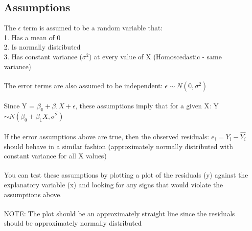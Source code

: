 \documentclass[12pt, a4paper]{article}
\begin{document}
	\subsection{Assumptions}
	The $\epsilon$ term is assumed to be a random variable that: \\
	1. Has a mean of 0 \\
	2. Is normally distributed \\
	3. Has constant variance ($\sigma^2$) at every value of X (Homoscedastic - same variance) \\~\\
	The error terms are also assumed to be independent: $\epsilon \sim N(0,\sigma^2)$ \\~\\
	Since Y = $\beta_0 + \beta_1X + \epsilon$, these assumptions imply that for a given X: Y $\sim N(\beta_0 + \beta_1X, \sigma^2)$ \\~\\
	If the error assumptions above are true, then the observed residuals: $e_i = Y_i - \hat{Y_i}$ should behave in a similar fashion (approximately normally distributed with constant variance for all X values) \\~\\
	You can test these assumptions by plotting a plot of the residuals (y) against the explanatory variable (x) and looking for any signs that would violate the assumptions above. \\~\\
	NOTE: The plot should be an approximately straight line since the residuals should be approximately normally distributed \\~\\
	
\end{document}
